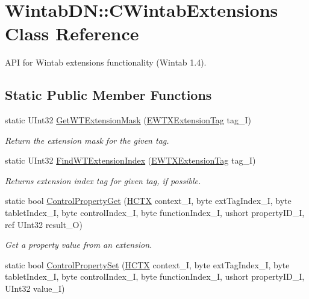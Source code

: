 \hypertarget{class_wintab_d_n_1_1_c_wintab_extensions}{
\section{WintabDN::CWintabExtensions Class Reference}
\label{class_wintab_d_n_1_1_c_wintab_extensions}
}


API for Wintab extensions functionality (Wintab 1.4).  


\subsection*{Static Public Member Functions}
\begin{DoxyCompactItemize}
\item 
static UInt32 \hyperlink{class_wintab_d_n_1_1_c_wintab_extensions_a341efefa1ea2122f128582744ca0a72d}{GetWTExtensionMask} (\hyperlink{namespace_wintab_d_n_a303ef868b8887dc43872ddac8a7d059b}{EWTXExtensionTag} tag\_\-I)
\begin{DoxyCompactList}\small\item\em Return the extension mask for the given tag. \item\end{DoxyCompactList}\item 
static UInt32 \hyperlink{class_wintab_d_n_1_1_c_wintab_extensions_afccef5150c3899b2ce92ee7344cc685a}{FindWTExtensionIndex} (\hyperlink{namespace_wintab_d_n_a303ef868b8887dc43872ddac8a7d059b}{EWTXExtensionTag} tag\_\-I)
\begin{DoxyCompactList}\small\item\em Returns extension index tag for given tag, if possible. \item\end{DoxyCompactList}\item 
static bool \hyperlink{class_wintab_d_n_1_1_c_wintab_extensions_a03d4b7c76028a930e958d052b35272b7}{ControlPropertyGet} (\hyperlink{class_wintab_d_n_1_1_h_c_t_x}{HCTX} context\_\-I, byte extTagIndex\_\-I, byte tabletIndex\_\-I, byte controlIndex\_\-I, byte functionIndex\_\-I, ushort propertyID\_\-I, ref UInt32 result\_\-O)
\begin{DoxyCompactList}\small\item\em Get a property value from an extension. \item\end{DoxyCompactList}\item 
static bool \hyperlink{class_wintab_d_n_1_1_c_wintab_extensions_a57902151c5bc1beee158adfd3710cd77}{ControlPropertySet} (\hyperlink{class_wintab_d_n_1_1_h_c_t_x}{HCTX} context\_\-I, byte extTagIndex\_\-I, byte tabletIndex\_\-I, byte controlIndex\_\-I, byte functionIndex\_\-I, ushort propertyID\_\-I, UInt32 value\_\-I)

\end{DoxyCompactItemize}

